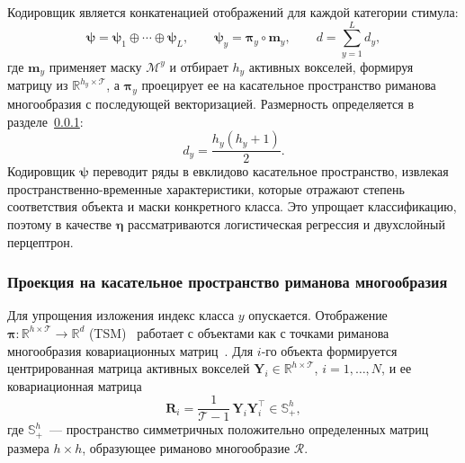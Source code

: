Кодировщик является конкатенацией отображений для каждой категории стимула:
\begin{equation}\label{eq:cls_psi}
\boldsymbol{\psi} = \boldsymbol{\psi}_1 \oplus \cdots \oplus \boldsymbol{\psi}_L, \qquad \boldsymbol{\psi}_y = \boldsymbol{\pi}_y \circ \mathbf{m}_y, \qquad d = \sum_{y=1}^{L} d_y,
\end{equation}
где $\mathbf{m}_y$ применяет маску $\mathcal{M}^{y}$ и отбирает $h_y$ активных вокселей, формируя матрицу из $\mathbb{R}^{h_y \times \mathcal{T}}$, а $\boldsymbol{\pi}_y$ проецирует ее на касательное пространство риманова многообразия с последующей векторизацией. Размерность определяется в разделе~\ref{sec3:cls_tsm}:
\begin{equation}\label{eq:cls_dim}
d_y = \frac{h_y(h_y+1)}{2}.
\end{equation}
Кодировщик $\boldsymbol{\psi}$ переводит ряды в евклидово касательное пространство, извлекая пространственно-временные характеристики, которые отражают степень соответствия объекта и маски конкретного класса. Это упрощает классификацию, поэтому в качестве $\boldsymbol{\eta}$ рассматриваются логистическая регрессия и двухслойный перцептрон.

\subsubsection{Проекция на касательное пространство риманова многообразия}\label{sec3:cls_tsm}
Для упрощения изложения индекс класса $y$ опускается. Отображение $\boldsymbol{\pi}: \mathbb{R}^{h \times \mathcal{T}} \to \mathbb{R}^{d}$ (TSM)~\cite{barachant2011multiclass} работает с объектами как с точками риманова многообразия ковариационных матриц~\cite{barachant2010riemannian}. Для $i$-го объекта формируется центрированная матрица активных вокселей $\mathbf{Y}_i \in \mathbb{R}^{h \times \mathcal{T}}$, $i = 1, \ldots, N$, и ее ковариационная матрица
\begin{equation}\label{eq:cls_cov}
\mathbf{R}_i = \frac{1}{\mathcal{T}-1}\, \mathbf{Y}_i \mathbf{Y}_i^{\top} \in \mathbb{S}_{+}^{h},
\end{equation}
где $\mathbb{S}_{+}^{h}$~--- пространство симметричных положительно определенных матриц размера $h \times h$, образующее риманово многообразие $\mathcal{R}$.

